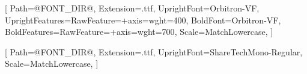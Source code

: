 
\usepackage{xcolor}
\usepackage{pagecolor}
\usepackage{titlesec}
\usepackage{tcolorbox}


\pagecolor{bgPrimary}
\color{textPrim}

\setsansfont{Orbitron}[
    Path=@FONT_DIR@,
    Extension=.ttf,
    UprightFont=Orbitron-VF,
    UprightFeatures={RawFeature={+axis={wght=400}}},
    BoldFont=Orbitron-VF,
    BoldFeatures={RawFeature={+axis={wght=700}}},
    Scale=MatchLowercase,
]

\setmonofont{ShareTechMono}[
    Path=@FONT_DIR@,
    Extension=.ttf,
    UprightFont=ShareTechMono-Regular,
    Scale=MatchLowercase,
]

